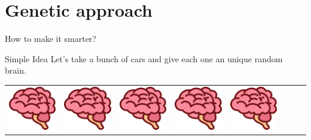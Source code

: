 \documentclass{beamer}
\begin{document}
\section{Genetic approach}


\begin{frame}{How to make it smarter?}
    \begin{exampleblock}{Simple Idea}
        \centering
        \small{Let’s take a bunch of cars and give each one an unique random brain.}
        \hfill
        \begin{tabular}{c|c|c|c|c|c|c|c}
            \includegraphics[scale=0.66]{brain0.png}&
            \includegraphics[scale=0.66]{brain0.png}&
            \includegraphics[scale=0.66]{brain0.png}&
            \includegraphics[scale=0.66]{brain0.png}&
            \includegraphics[scale=0.66]{brain0.png}&

\end{tabular}
\end{exampleblock}
\end{frame}
\end{document}
